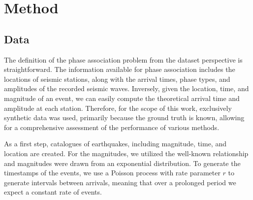 \documentclass{scrreprt}
\begin{document}
\chapter{Method}

\section{Data}
The definition of the phase association problem from the dataset perspective is straightforward. The information available for phase association includes the locations of seismic stations, along with the arrival times, phase types, and amplitudes of the recorded seismic waves. Inversely, given the location, time, and magnitude of an event, we can easily compute the theoretical arrival time and amplitude at each station. Therefore, for the scope of this work, exclusively synthetic data was used, primarily because the ground truth is known, allowing for a comprehensive assessment of the performance of various methods.

As a first step, catalogues of earthquakes, including magnitude, time, and location are created. For the magnitudes, we utilized the well-known \citet{GR1944} relationship and magnitudes were drawn from an exponential distribution. To generate the timestamps of the events, we use a Poisson process with rate parameter $r$ to generate intervals between arrivals, meaning that over a prolonged period we expect a constant rate of events.
\end{document}

